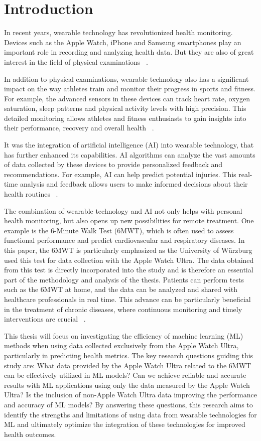 \chapter{Introduction}

In recent years, wearable technology has revolutionized health monitoring. Devices such as the Apple Watch, iPhone and Samsung smartphones play an important role in recording and analyzing health data. But they are also of great interest in the field of physical examinations ~\cite{healthtechmagazineLatestTrends}.

In addition to physical examinations, wearable technology also has a significant impact on the way athletes train and monitor their progress in sports and fitness. For example, the advanced sensors in these devices can track heart rate, oxygen saturation, sleep patterns and physical activity levels with high precision. This detailed monitoring allows athletes and fitness enthusiasts to gain insights into their performance, recovery and overall health ~\cite{doi:10.1177/1941738115616917}.

It was the integration of artificial intelligence (AI) into wearable technology, that has further enhanced its capabilities. AI algorithms can analyze the vast amounts of data collected by these devices to provide personalized feedback and recommendations. For example, AI can help predict potential injuries. This real-time analysis and feedback allows users to make informed decisions about their health routines ~\cite{s22186920}.

The combination of wearable technology and AI not only helps with personal health monitoring, but also opens up new possibilities for remote treatment. One example is the 6-Minute Walk Test (6MWT), which is often used to assess functional performance and predict cardiovascular and respiratory diseases. In this paper, the 6MWT is particularly emphasized as the University of Würzburg used this test for data collection with the Apple Watch Ultra. The data obtained from this test is directly incorporated into the study and is therefore an essential part of the methodology and analysis of the thesis. Patients can perform tests such as the 6MWT at home, and the data can be analyzed and shared with healthcare professionals in real time. This advance can be particularly beneficial in the treatment of chronic diseases, where continuous monitoring and timely interventions are crucial ~\cite{s22020581}.

This thesis will focus on investigating the efficiency of machine learning (ML) methods when using data collected exclusively from the Apple Watch Ultra, particularly in predicting health metrics. The key research questions guiding this study are: What data provided by the Apple Watch Ultra related to the 6MWT can be effectively utilized in ML models? Can we achieve reliable and accurate results with ML applications using only the data measured by the Apple Watch Ultra? Is the inclusion of non-Apple Watch Ultra data improving the performance and accuracy of ML models? By answering these questions, this research aims to identify the strengths and limitations of using data from wearable technologies for ML and ultimately optimize the integration of these technologies for improved health outcomes.

